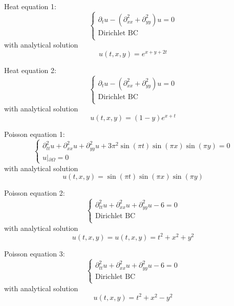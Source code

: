 \documentclass{article}
\begin{document}
\begin{enumerate}[label={[\arabic*]}]
\item{Heat equation 1:
\[\left\{ \begin{array}{llllllll}
\partial_{t} u - (\partial_{xx}^2+\partial_{yy}^2) u = 0\\
\mbox{Dirichlet BC}\\
\end{array}
\right. \]
with analytical solution
\[u(t,x,y)=e^{x+y+2t}\]\label{eq:Heat3D1}}

\item{Heat equation 2: 
\[\left\{ \begin{array}{llllllll}
\partial_{t} u -  (\partial_{xx}^2+\partial_{yy}^2) u = 0\\
\mbox{Dirichlet BC}\\
\end{array}
\right.\]
with analytical solution
\[u(t,x,y)=(1-y)e^{x+t}\]\label{eq:Heat3D2}}

\item{Poisson equation 1:
\[\left\{ \begin{array}{llllllll}
\partial_{tt}^2 u + \partial_{xx}^2 u + \partial_{yy}^2 u + 3\pi^2\sin(\pi t)\sin(\pi x)\sin(\pi y) = 0 \\
u\left|_{\partial\Omega}\right.=0
\end{array}
\right. \]
with analytical solution
\[u(t,x,y)=\sin(\pi t)\sin(\pi x)\sin(\pi y)\]\label{eq:Poisson3D1}}

\item{Poisson equation 2: 
\[\left\{ \begin{array}{llllllll}
\partial_{tt}^2 u + \partial_{xx}^2 u + \partial_{yy}^2 u -6 = 0\\
\mbox{Dirichlet BC}\\
\end{array}
\right.\]
with analytical solution
\[u(t,x,y)= u(t,x,y)=t^2+x^2+y^2\]\label{eq:Poisson3D2}}

\item{Poisson equation 3:
\[\left\{ \begin{array}{llllllll}
\partial_{tt}^2 u + \partial_{xx}^2 u + \partial_{yy}^2 u -6 = 0\\
\mbox{Dirichlet BC}\\
\end{array}
\right.\]
with analytical solution
\[u(t,x,y)=t^2+x^2-y^2\]\label{eq:Poisson3D3}} 


\end{enumerate}
\end{document}
